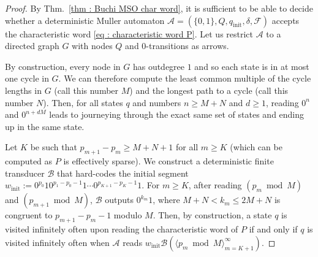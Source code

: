 \documentclass[10pt,a4paper]{amsart}
\begin{document}
\begin{proof}
  By Thm.~\ref{thm : Buchi MSO char word}, it is sufficient to be able
  to decide whether a deterministic Muller automaton
  $\mathcal{A} = (\{0,1\}, Q, q_{\text{init}}, \delta, \mathcal{F})$
  accepts the characteristic word \eqref{eq : characteristic word P}.
  Let us restrict $\mathcal{A}$ to a directed graph $G$ with nodes $Q$
  and $0$-transitions as arrows.

  By construction, every node in $G$ has outdegree $1$ and so each
  state is in at most one cycle in $G$.  We can therefore compute the
  least common multiple of the cycle lengths in $G$ (call this number
  $M$) and the longest path to a cycle (call this number $N$).  Then,
  for all states $q$ and numbers $n \ge M + N$ and $d \ge 1$, reading
  $0^n$ and $0^{n+dM}$ leads to journeying through the exact same set
  of states and ending up in the same state.

  Let $K$ be such that $p_{m+1} - p_m \ge M + N+1$ for all $m \ge K$
  (which can be computed as $P$ is effectively sparse).  We construct
  a deterministic finite transducer $\mathcal{B}$ that hard-codes the
  initial segment
  $w_\text{init} := 0^{p_0}10^{p_1-p_0-1}1\cdots
  0^{p_{K+1}-p_{K}-1}1$.  For $m \ge K$, after reading
  $(p_m\bmod M)$ and $(p_{m+1}\bmod M)$, $\mathcal{B}$ outputs
  $0^{k_m}1$, where $M+N < k_m \le 2M + N$ is congruent to
  $p_{m+1} - p_m - 1$ modulo $M$.  Then, by construction, a state $q$
  is visited infinitely often upon reading the characteristic word of
  $P$ if and only if $q$ is visited infinitely often when
  $\mathcal{A}$ reads
  $w_\text{init}\mathcal{B}(\langle p_m\bmod M\rangle_{m=K+1}^\infty)$.


\end{proof}
\end{document}
